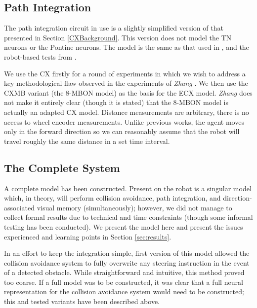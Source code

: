 \documentclass[a4paper,11pt,twoside,openright]{article}
\begin{document}
\subsection{ Path Integration }
The path integration circuit in use is a slightly simplified version of that
presented in Section \ref{CXBackground}. This version does not model the
TN neurons or the Pontine neurons. The model is the same as that used in
\cite{Scimeca2017, Zhang2017}, and the robot-based tests from \cite{Stone2017}.
\newline\par

We use the CX firstly for a round of experiments in which we wish to address a
key methodological flaw observed in the experiments of \textit{Zhang}
\cite{Zhang2017}. We then use the CXMB variant (the 8-MBON model)
as the basis for the ECX model. \textit{Zhang} does not make it entirely clear
(though it is stated) that the 8-MBON model is actually an adapted CX model.
Distance measurements are arbitrary, there is no access to wheel encoder
measurements. Unlike previous works, the agent moves only in the forward
direction so we can reasonably assume that the robot will travel roughly the same
distance in a set time interval.

\subsection{ The Complete System}
A complete model has been constructed. Present on the robot is a
singular model which, in theory, will perform collision avoidance,
path integration, and direction-associated visual memory
(simultaneously); however, we did not manage to collect formal results
due to technical and time constraints (though some informal testing
has been conducted). We present the model here and present the issues
experienced and learning points in Section \ref{sec:results}.
\newline\par

In an effort to keep the integration simple, first version of this
model allowed the collision avoidance system to fully overwrite any
steering instruction in the event of a detected obstacle. While
straightforward and intuitive, this method proved too coarse. If a
full model was to be constructed, it was clear that a full neural
representation for the collision avoidance system would need to be
constructed; this and tested variants have been described above.
\newline\par
\end{document}
